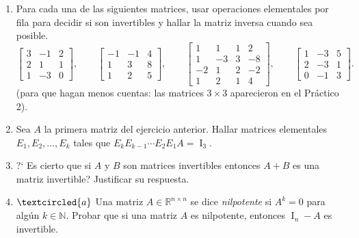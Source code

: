 \documentclass[12pt]{amsart}
\begin{document}
\begin{enumerate}[topsep=6pt,itemsep=6pt]


\item\label{ej:inversas} Para cada una de las siguientes matrices, usar operaciones elementales
por fila para decidir si son invertibles y hallar la matriz inversa cuando sea posible.
\begin{equation*}
\begin{bmatrix} 3 & -1 & 2 \\ 2 & 1 & 1 \\ 1 & -3 & 0\end{bmatrix},\qquad
\begin{bmatrix} -1 & -1 &4 \\ 1 & 3 & 8 \\ 1 & 2 & 5\end{bmatrix},\qquad
\begin{bmatrix} 1 & 1 & 1 & 2 \\ 1 & -3 & 3 & -8 \\ -2 & 1 & 2 & -2 \\ 1 & 2 & 1 & 4 \end{bmatrix},\qquad
\begin{bmatrix} 1 & -3 & 5 \\ 2 & -3 & 1 \\ 0 & -1 & 3 \end{bmatrix}.
\end{equation*}
(para que hagan menos cuentas: las matrices $3\times3$ aparecieron en el Pr\'actico 2).


\item Sea $A$ la primera matriz del ejercicio anterior.
Hallar matrices elementales $E_1,E_2,\dots,E_k$ tales que $E_kE_{k-1}\cdots E_2E_1A=\operatorname{I}_3$.


\item ?` Es cierto que si $A$ y $B$ son matrices invertibles entonces $A+B$ es una matriz invertible? Justificar su respuesta.

\item\label{nilpotene - id} $\textcircled{a}$ Una matriz $A\in\mathbb{R}^{n\times n}$ se dice \emph{nilpotente} si $A^k=0$ para alg\'un $k\in\mathbb{N}$.
Probar que si una matriz $A$ es nilpotente, entonces  $\operatorname{I}_n - A$  es invertible.



\end{enumerate}
\end{document}
